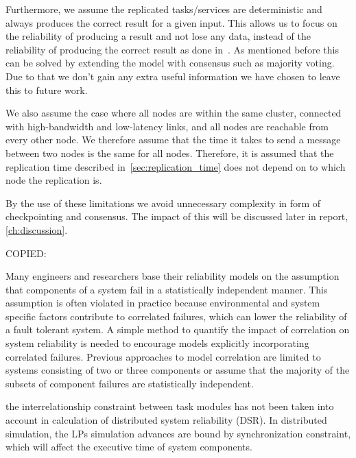 \documentclass{cslthse-msc}
\begin{document}
Furthermore, we assume the replicated tasks/services are deterministic and always produces the correct result for a given input. This allows us to focus on the reliability of producing a result and not lose any data, instead of the reliability of producing the correct result as done in~\cite{selfAdaptRel, dynAdaptRepl, relModelWebServices}. As mentioned before this can be solved by extending the model with consensus such as majority voting. Due to that we don't gain any extra useful information we have chosen to leave this to future work.

We also assume the case where all nodes are within the same cluster, connected with high-bandwidth and low-latency links, and all nodes are reachable from every other node. We therefore assume that the time it takes to send a message between two nodes is the same for all nodes. Therefore, it is assumed that the replication time described in~\cref{sec:replication_time} does not depend on to which node the replication is.

By the use of these limitations we avoid unnecessary complexity in form of checkpointing and consensus. The impact of this will be discussed later in report, \cref{ch:discussion}.

\iffalse
COPIED:

Many engineers and researchers base their reliability models on the assumption that components of a system fail in a statistically independent manner. This assumption is often violated in practice because environmental and system specific factors contribute to correlated failures, which can lower the reliability of a fault tolerant system. A simple method to quantify the impact of correlation on system reliability is needed to encourage models explicitly incorporating correlated failures. Previous approaches to model correlation are limited to systems consisting of two or three components or assume that the majority of the subsets of component failures are statistically independent. \cite{discContRelModel}

the interrelationship constraint between task modules has not been taken into account in calculation of distributed system reliability (DSR). In distributed simulation, the LPs simulation advances are bound by synchronization constraint, which will affect the executive time of system components. \cite{relModelDistSimSystem}
\end{document}
